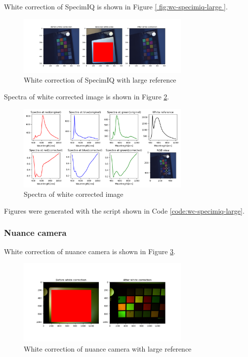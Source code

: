 White correction of SpecimIQ is shown in Figure \ref{
  fig:wc-specimiq-large
}.

\begin{figure}[H]
  \centering
  \caption{White correction of SpecimIQ with large reference}
  \label{fig:wc-specimiq-large}
  \includegraphics[width=0.75\textwidth]{
    ./fig-task1/wc-specimiq-large.png
  }
\end{figure}

Spectra of white corrected image is shown in Figure
\ref{fig:wc-specimiq-large-spectra}.

\begin{figure}[H]
  \centering
  \caption{Spectra of white corrected image}
  \label{fig:wc-specimiq-large-spectra}
  \includegraphics[width=0.75\textwidth]{
    ./fig-task1/wc-specimiq-large-spectra.png
  }
\end{figure}

Figures were generated with the script shown in Code
\ref{code:wc-specimiq-large}.

\subsubsection{Nuance camera}
White correction of nuance camera is shown in Figure
\ref{fig:wc-nuance-camera-large}.

\begin{figure}[H]
  \centering
  \caption{
    White correction of nuance camera with large reference
  }
  \label{fig:wc-nuance-camera-large}
  \includegraphics[width=0.75\textwidth] {
    ./fig-task1/wc-nuance-large.png
  }
\end{figure}

